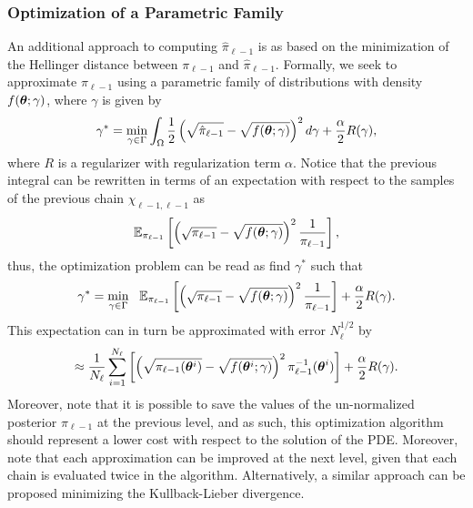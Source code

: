 \subsubsection{Optimization of a Parametric Family}
An additional approach to computing $\hat{\pi}_{\ell-1}$ is as based on the minimization of the Hellinger distance between $\pi_{\ell-1}$ and $\hat{\pi}_{\ell-1}$. Formally, we seek to approximate ${\pi}_{\ell-1}$ using a parametric family of distributions with density  $f(\bm{\theta};\gamma)$, where $\gamma$ is given by \begin{align}
\gamma^*=\min_{\gamma\in \Gamma}\int_\Omega \frac{1}{2}\left(\sqrt{\hat{\pi}_{\ell-1}}-\sqrt{f(\bm{\theta};\gamma)}\right)^2d\gamma +\frac{\alpha}{2}R(\gamma),
\end{align}
where $R$ is a regularizer with regularization term $\alpha$.  Notice that the previous integral can be rewritten in terms of an expectation with respect to the samples of the previous  chain $\chi_{\ell-1,\ell-1}$ as \begin{align}
\mathbb{E}_{\pi_{\ell-1}}\left[ \left(\sqrt{{\pi}_{\ell-1}}-\sqrt{f(\bm{\theta};\gamma)}\right)^2\frac{1}{{\pi}_{\ell-1}}	\right],
\end{align}
thus, the optimization problem can be read as find $\gamma^*$ such that
\begin{align}
\gamma^*=\min_{\gamma\in \Gamma}\ \ \mathbb{E}_{\pi_{\ell-1}}\left[ \left(\sqrt{{\pi}_{\ell-1}}-\sqrt{f(\bm{\theta};\gamma)}\right)^2\frac{1}{{\pi}_{\ell-1}}	\right]+\frac{\alpha}{2}R(\gamma).
\end{align}
This expectation can in turn be approximated with error $N_\ell^{1/2}$ by 
\begin{align}
\approx\frac{1}{N_\ell}\sum_{i=1}^{N_\ell}\left[\left(\sqrt{{\pi}_{\ell-1}(\bm{\theta}^i)}-\sqrt{f(\bm{\theta}^i;\gamma)}\right)^2 {\pi}^{-1}_{\ell-1}(\bm{\theta} ^i )\right]+\frac{\alpha}{2}R(\gamma).
\end{align}
Moreover, note that it is possible to save the values of the un-normalized posterior $\pi_{\ell-1}$ at the previous level,  and as such, this optimization algorithm should represent a  lower cost with respect to the solution of the PDE. Moreover, note that each approximation can be improved at the next level, given that each chain is evaluated twice in the algorithm.  Alternatively, a similar approach can be proposed minimizing the Kullback-Lieber divergence.


